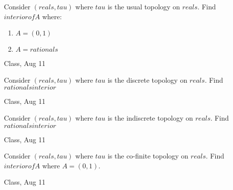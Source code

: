 \begin{samepage}
\begin{ex}
Consider $(reals, tau)$ where $tau$ is the usual topology on $reals$.
Find $interior of A$ where:
    \begin{enumerate}
        \item $A = (0,1)$
        \item $A = rationals$
    \end{enumerate}
\end{ex}
\begin{source}
Class, Aug 11
\end{source}
\end{samepage}

\begin{samepage}
\begin{ex}
Consider $(reals, tau)$ where $tau$ is the discrete topology on $reals$.
Find $rationals interior$
\end{ex}
\begin{source}
Class, Aug 11
\end{source}
\end{samepage}

\begin{samepage}
\begin{ex}
Consider $(reals, tau)$ where $tau$ is the indiscrete topology on $reals$.
Find $rationals interior$
\end{ex}
\begin{source}
Class, Aug 11
\end{source}
\end{samepage}

\begin{samepage}
\begin{ex}
Consider $(reals, tau)$ where $tau$ is the co-finite topology on $reals$.
Find $interior of A$ where $A = (0,1)$.
\end{ex}
\begin{source}
Class, Aug 11
\end{source}
\end{samepage}
